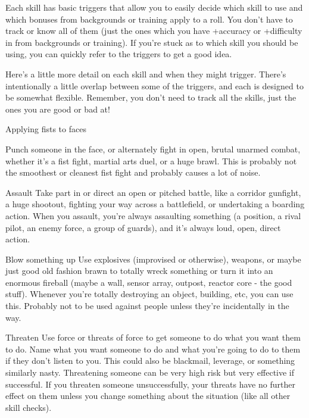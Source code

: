 Each skill has basic triggers that allow you to easily decide which skill to use and which  
bonuses from backgrounds or training apply to a roll. You don’t have to track or know all of  
them (just the ones which you have +accuracy or +difficulty in from backgrounds or training). If  
you’re stuck as to which skill you should be using, you can quickly refer to the triggers to get a  
good idea.
 

Here’s a little more detail on each skill and when they might trigger. There’s intentionally a little  
overlap between some of the triggers, and each is designed to be somewhat flexible.  
Remember, you don’t need to track all the skills, just the ones you are good or bad at!
 

Applying fists to faces  

                                                                                                                   


Punch someone in the face, or alternately fight in open, brutal unarmed combat, whether it’s a fist  
fight, martial arts duel, or a huge brawl. This is probably not the smoothest or cleanest fist fight  
and probably causes a lot of noise.  

Assault  
Take part in or direct an open or pitched battle, like a corridor gunfight, a huge shootout, fighting  
your way across a battlefield, or undertaking a boarding action. When you assault, you’re always  
assaulting something (a position, a rival pilot, an enemy force, a group of guards), and it’s always  
loud, open, direct action.  

Blow something up  
Use explosives (improvised or otherwise), weapons, or maybe just good old fashion brawn to  
totally wreck something or turn it into an enormous fireball (maybe a wall, sensor array, outpost,  
reactor core - the good stuff). Whenever you’re totally destroying an object, building, etc, you can  
use this. Probably not to be used against people unless they’re incidentally in the way.  

Threaten  
Use force or threats of force to get someone to do what you want them to do. Name what you  
want someone to do and what you’re going to do to them if they don’t listen to you. This could  
also be blackmail, leverage, or something similarly nasty. Threatening someone can be very high  
risk but very effective if successful. If you threaten someone unsuccessfully, your threats have no  
further effect on them unless you change something about the situation (like all other skill checks).  

